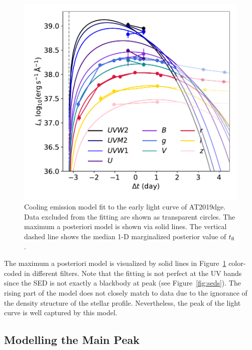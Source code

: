 \documentclass[twocolumn]{aastex63}
\begin{document}
\begin{CJK*}{UTF8}{gbsn}
\begin{figure}[htbp!]
	\centering
	\includegraphics[width=\columnwidth]{figures/P15model.pdf}
	\caption{Cooling emission model fit to the early light curve of AT2019dge. 
		Data excluded from the fitting are shown as transparent circles. 
		The maximum a posteriori model is shown via solid lines.
		The vertical dashed line shows the median 1-D marginalized posterior value of
		$t_{\rm fl}$.
		\label{fig:piromodel}}
\end{figure}

The maximum a posteriori model is visualized by solid lines in Figure~\ref{fig:piromodel} color-coded in 
different filters. Note that the fitting is not perfect at the UV bands since 
the SED is not exactly a blackbody at peak (see Figure~\ref{fig:seds}). The rising part of the model 
does not closely match to data due to the ignorance of the density structure of the stellar profile. 
Nevertheless, the peak of the light curve is well captured by this model.

\subsection{Modelling the Main Peak}\label{subsec:arnettfit}


\end{CJK*}
\end{document}
